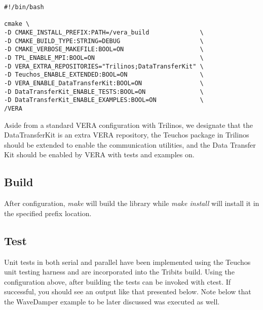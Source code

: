 \documentclass[letterpaper]{article}
\begin{document}
\begin{verbatim}
#!/bin/bash

cmake \
-D CMAKE_INSTALL_PREFIX:PATH=/vera_build              \
-D CMAKE_BUILD_TYPE:STRING=DEBUG                      \
-D CMAKE_VERBOSE_MAKEFILE:BOOL=ON                     \
-D TPL_ENABLE_MPI:BOOL=ON                             \
-D VERA_EXTRA_REPOSITORIES="Trilinos;DataTransferKit" \
-D Teuchos_ENABLE_EXTENDED:BOOL=ON                    \
-D VERA_ENABLE_DataTransferKit:BOOL=ON                \
-D DataTransferKit_ENABLE_TESTS:BOOL=ON               \
-D DataTransferKit_ENABLE_EXAMPLES:BOOL=ON            \
/VERA
\end{verbatim}

Aside from a standard VERA configuration with Trilinos, we designate
that the DataTransferKit is an extra VERA repository, the Teuchos package in
Trilinos should be extended to enable the communication utilities, and
the Data Transfer Kit should be enabled by VERA with tests and examples
on.

\subsection{Build}

After configuration, {\sl make} will build the library while {\sl make
  install} will install it in the specified prefix location.

\subsection{Test}
Unit tests in both serial and parallel have been implemented using the
Teuchos unit testing harness and are incorporated into the Tribits
build. Using the configuration above, after building the tests can be
invoked with ctest. If successful, you should see an output like that
presented below. Note below that the WaveDamper example to be later
discussed was executed as well.
\end{document}
